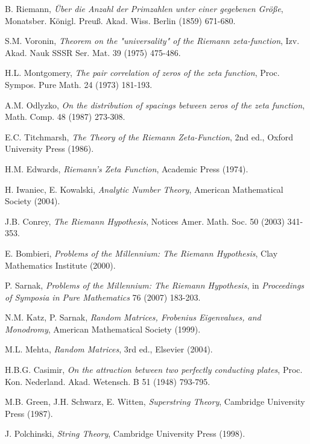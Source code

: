 \documentclass[11pt]{article}
\begin{document}
\begin{thebibliography}{99}

 B. Riemann, \textit{Über die Anzahl der Primzahlen unter einer gegebenen Größe}, Monatsber. Königl. Preuß. Akad. Wiss. Berlin (1859) 671-680.

 S.M. Voronin, \textit{Theorem on the "universality" of the Riemann zeta-function}, Izv. Akad. Nauk SSSR Ser. Mat. 39 (1975) 475-486.

 H.L. Montgomery, \textit{The pair correlation of zeros of the zeta function}, Proc. Sympos. Pure Math. 24 (1973) 181-193.

 A.M. Odlyzko, \textit{On the distribution of spacings between zeros of the zeta function}, Math. Comp. 48 (1987) 273-308.

 E.C. Titchmarsh, \textit{The Theory of the Riemann Zeta-Function}, 2nd ed., Oxford University Press (1986).

 H.M. Edwards, \textit{Riemann's Zeta Function}, Academic Press (1974).

 H. Iwaniec, E. Kowalski, \textit{Analytic Number Theory}, American Mathematical Society (2004).

 J.B. Conrey, \textit{The Riemann Hypothesis}, Notices Amer. Math. Soc. 50 (2003) 341-353.

 E. Bombieri, \textit{Problems of the Millennium: The Riemann Hypothesis}, Clay Mathematics Institute (2000).

 P. Sarnak, \textit{Problems of the Millennium: The Riemann Hypothesis}, in \textit{Proceedings of Symposia in Pure Mathematics} 76 (2007) 183-203.

 N.M. Katz, P. Sarnak, \textit{Random Matrices, Frobenius Eigenvalues, and Monodromy}, American Mathematical Society (1999).

 M.L. Mehta, \textit{Random Matrices}, 3rd ed., Elsevier (2004).

 H.B.G. Casimir, \textit{On the attraction between two perfectly conducting plates}, Proc. Kon. Nederland. Akad. Wetensch. B 51 (1948) 793-795.

 M.B. Green, J.H. Schwarz, E. Witten, \textit{Superstring Theory}, Cambridge University Press (1987).

 J. Polchinski, \textit{String Theory}, Cambridge University Press (1998).


\end{thebibliography}
\end{document}
